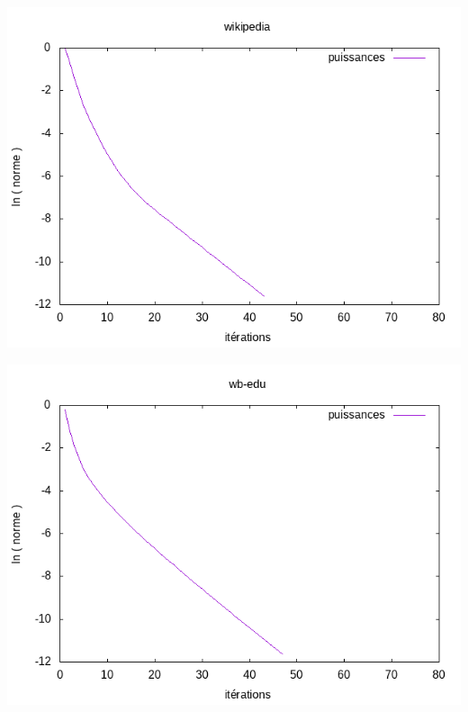 		\begin{minipage}[c]{.46\linewidth}
			\begin{center}
				\includegraphics[scale=0.5]{plot-wikipedia.png}
			\end{center}
		\end{minipage} \hfill
		\begin{minipage}[c]{.46\linewidth}
			\begin{center}
				\includegraphics[scale=0.5]{plot-wb-edu.png}
			\end{center}
		\end{minipage}\\


	
			
